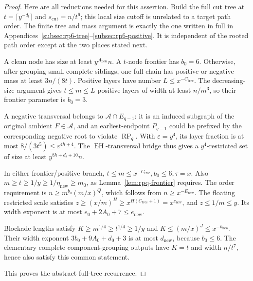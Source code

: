 \documentclass[11pt,a4paper]{article}
\theoremstyle{definition}
\theoremstyle{remark}
\numberwithin{equation}{section}
\DeclareMathOperator{\RP}{RP}
\begin{document}
\begin{proof}
Here are all reductions needed for this assertion. Build the full cut tree at \(t=\lceil y^{-d_{t}}\rceil\) and \(s_{\mathrm{cut}}=n/t^{6}\); this local size cutoff is unrelated to a target path order. The finite tree and mass argument is exactly the one written in full in Appendices~\ref{subsec:rp6-tree}--\ref{subsec:rp6-positive}. It is independent of the rooted path order except at the two places stated next.

A clean node has size at least \(y^{A_{\mathrm{new}}} n\). A \(t\)-node frontier has \(b_{0}=6\). Otherwise, after grouping small complete siblings, one full chain has positive or negative mass at least \(3n/(8t)\). Positive layers have number \(L\le\allowbreak x^{-C_{\mathrm{tree}}}\). The decreasing-size argument gives \(t\le\allowbreak m\le\allowbreak L\) positive layers of width at least \(n/m^{3}\), so their frontier parameter is \(b_{0}=3\).

A negative transversal belongs to \(\mathcal A\cap  E_{q-1}\): it is an induced subgraph of the original ambient \(F\in\mathcal A\), and an earliest-endpoint \(P_{q-1}\) could be prefixed by the corresponding negative root to violate \(\RP_{q}\). With \(\varepsilon=y^{4}\), its layer fraction is at most \(8/(3t^{5})\le\allowbreak \varepsilon^{4h+4}\). The \(\operatorname{EH}\)-transversal bridge thus gives a \(y^{4}\)-restricted set of size at least \(y^{8h+d_{t}+10}n\).

In either frontier/positive branch, \(t\le\allowbreak m\le\allowbreak x^{-C_{\mathrm{tree}}},\allowbreak  b_{0}\le\allowbreak 6,\allowbreak  \tau=x\). Also \(m\ge t\ge 1/y\ge 1/\eta_{\mathrm{new}}\ge m_{0}\), as Lemma~\ref{lem:rpq-frontier} requires. The order requirement is \(n\ge\allowbreak m^{b_{0}} (m/x)^{Q}\), which follows from \(n\ge\allowbreak x^{-E_{\mathrm{new}}}\). The floating restricted scale satisfies \(z\ge\allowbreak (x/m)^{H}\ge\allowbreak x^{H(C_{\mathrm{tree}}+1)}=x^{c_{\mathrm{new}}}\), and \(z\le\allowbreak 1/m\le\allowbreak y\). Its width exponent is at most \(e_{0}+2A_{0}+7\le\allowbreak e_{\mathrm{new}}\).

Blockade lengths satisfy \(K\ge\allowbreak m^{1/4}\ge\allowbreak t^{1/4}\ge\allowbreak 1/y\) and \(K\le\allowbreak (m/x)^{J}\le\allowbreak x^{-k_{\mathrm{new}}}\). Their width exponent \(3b_{0}+9A_{0}+d_{0}+3\) is at most \(d_{\mathrm{new}}\), because \(b_{0}\le6\). The elementary complete component-grouping outputs have \(K=t\) and width \(n/t^{7}\), hence also satisfy this common statement.

This proves the abstract full-tree recurrence.
\end{proof}
\end{document}
